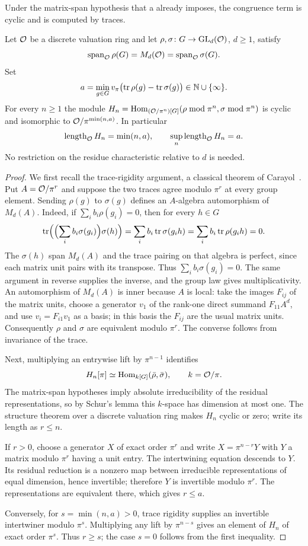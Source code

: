Under the matrix-span hypothesis that a  already imposes,
the congruence term is cyclic and is computed by traces.

\begin{theorem}\label{sel:thm:tracedepth}
Let $\mathcal{O}$ be a discrete valuation ring and let
$\rho,\sigma\colon G\to\operatorname{GL}_d(\mathcal{O})$, $d\ge1$, satisfy
\[
 \operatorname{span}_{\mathcal{O}}\rho(G)=M_d(\mathcal{O})=\operatorname{span}_{\mathcal{O}}\sigma(G).
\]
Set
\[
 a=\min_{g\in G}v_\pi\bigl(\operatorname{tr}\rho(g)-\operatorname{tr}\sigma(g)\bigr)\in\mathbb{N}\cup\{\infty\}.
\]
For every $n\ge1$ the module
$H_n=\operatorname{Hom}_{(\mathcal{O}/\pi^n)[G]}(\rho\bmod\pi^n,\sigma\bmod\pi^n)$ is cyclic and
isomorphic to $\mathcal{O}/\pi^{\min(n,a)}$. In particular
\[
 \operatorname{length}_{\mathcal{O}}H_n=\min(n,a),\qquad\sup_n\operatorname{length}_{\mathcal{O}}H_n=a .
\]
No restriction on the residue characteristic relative to $d$ is needed.
\end{theorem}

\begin{proof}
We first recall the trace-rigidity argument, a classical theorem of
Carayol~\cite{Carayol1994Representations}. Put $A=\mathcal{O}/\pi^r$ and suppose the
two traces agree modulo $\pi^r$ at every group element. Sending $\rho(g)$ to
$\sigma(g)$ defines an $A$-algebra automorphism of $M_d(A)$. Indeed, if
$\sum_ib_i\rho(g_i)=0$, then for every $h\in G$
\[
 \operatorname{tr}\Bigl(\Bigl(\sum_ib_i\sigma(g_i)\Bigr)\sigma(h)\Bigr)
 =\sum_ib_i\operatorname{tr}\sigma(g_ih)=\sum_ib_i\operatorname{tr}\rho(g_ih)=0 .
\]
The $\sigma(h)$ span $M_d(A)$ and the trace pairing on that algebra is
perfect, since each matrix unit pairs with its transpose. Thus
$\sum_ib_i\sigma(g_i)=0$. The same argument in reverse supplies the inverse,
and the group law gives multiplicativity. An automorphism of $M_d(A)$ is
inner because $A$ is local: take the images $F_{ij}$ of the matrix units,
choose a generator $v_1$ of the rank-one direct summand $F_{11}A^d$, and use
$v_i=F_{i1}v_1$ as a basis; in this basis the $F_{ij}$ are the usual matrix
units. Consequently $\rho$ and $\sigma$ are equivalent modulo $\pi^r$. The
converse follows from invariance of the trace.

Next, multiplying an entrywise lift by $\pi^{n-1}$ identifies
\[
 H_n[\pi]\simeq\operatorname{Hom}_{k[G]}(\bar\rho,\bar\sigma),\qquad k=\mathcal{O}/\pi .
\]
The matrix-span hypotheses imply absolute irreducibility of the residual
representations, so by Schur's lemma this $k$-space has dimension at most
one. The structure theorem over a discrete valuation ring makes $H_n$ cyclic
or zero; write its length as $r\le n$.

If $r>0$, choose a generator $X$ of exact order $\pi^r$ and write
$X=\pi^{n-r}Y$ with $Y$ a matrix modulo $\pi^r$ having a unit entry. The
intertwining equation descends to $Y$. Its residual reduction is a nonzero
map between irreducible representations of equal dimension, hence
invertible; therefore $Y$ is invertible modulo $\pi^r$. The representations
are equivalent there, which gives $r\le a$.

Conversely, for $s=\min(n,a)>0$, trace rigidity supplies an invertible
intertwiner modulo $\pi^s$. Multiplying any lift by $\pi^{n-s}$ gives an
element of $H_n$ of exact order $\pi^s$. Thus $r\ge s$; the case $s=0$
follows from the first inequality.
\end{proof}

